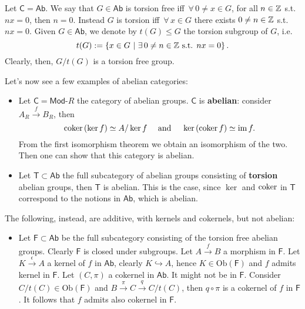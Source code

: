 \begin{ex}
	Let $\mathsf{C} = \mathsf{Ab}$. We say that $G \in \mathsf{Ab}$ is torsion free iff $\,\forall\,  0 \neq x \in G$, for all $n \in \mathbb{Z}$ s.t. $nx = 0$, then $n = 0$.
	Instead $G$ is torsion iff $\,\forall\,  x \in G$ there exists $0 \neq n \in \mathbb{Z}$ s.t. $nx = 0$.
	Given $G \in \mathsf{Ab}$, we denote by $t(G) \leq G$ the torsion subgroup of $G$, i.e.
	\begin{equation}
		t(G) := \left\{ x \in G \ \middle|\ \exists\, 0 \neq n \in \Z \text{ s.t. } nx = 0 \right\}
	.\end{equation} 
	Clearly, then, $G/t(G)$ is a torsion free group.

	Let's now see a few examples of abelian categories:
	\begin{itemize}
		\item Let $\mathsf{C} = \mathsf{Mod}\text{-}R$ the category of abelian groups.
			$\mathsf{C}$ is \textbf{abelian}: consider $A_R \xrightarrow{f} B_R$, then
			\begin{equation}
				\operatorname{coker} \left( \ker f \right) \simeq A/ \ker f \quad \text{ and } \quad
				\ker \left( \operatorname{coker} f \right) \simeq \operatorname{im} f
			.\end{equation} 
			From the first isomorphism theorem we obtain an isomorphism of the two.
			Then one can show that this category is abelian.
		\item Let $\mathsf{T} \subset \mathsf{Ab}$  the full subcategory of abelian groups consisting of \textbf{torsion} abelian groups, then $\mathsf{T}$ is abelian.
			This is the case, since $\ker$ and $\operatorname{coker}$ in $\mathsf{T}$ correspond to the notions in $\mathsf{Ab}$, which is abelian.
	\end{itemize}
	The following, instead, are additive, with kernels and cokernels, but not abelian:
	\begin{itemize}
		\item Let $\mathsf{F} \subset \mathsf{Ab}$ be the full subcategory consisting of the torsion free abelian groups.
			Clearly $\mathsf{F}$ is closed under subgroups.
			Let $A \xrightarrow{f} B$ a morphism in $\mathsf{F}$.
			Let $K \xrightarrow{\epsilon} A$ a kernel of $f$ in $\mathsf{Ab}$, clearly $K \hookrightarrow A$, hence $K \in \mathrm{Ob} \left(\mathsf{F}\right)$ and $f$ admits kernel in $\mathsf{F}$.
			Let $\left(C, \pi\right)$ a cokernel in $\mathsf{Ab}$. It might not be in $\mathsf{F}$.
			Consider $C/t(C) \in \mathrm{Ob} \left(\mathsf{F}\right)$ and $B \xrightarrow{\pi} C \xrightarrow{q} C/t(C)$, then $q \circ \pi$ is a cokernel of $f$ in $\mathsf{F}$.
			It follows that $f$ admits also cokernel in $\mathsf{F}$.


\end{itemize}
\end{ex}
